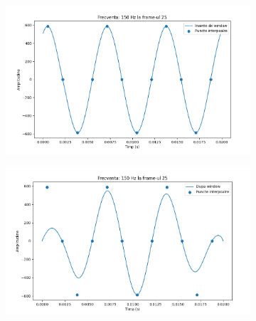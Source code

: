 \documentclass[12pt]{article}
\begin{document}
\begin{figure}[H]
	\centering
	\begin{subfigure}[b]{1\textwidth}
		\includegraphics[width=\linewidth]{grafic1.png}
	\end{subfigure}
	\hfill
	\begin{subfigure}[b]{1\textwidth}
		\includegraphics[width=\linewidth]{grafic2.png}
	\end{subfigure}
\end{figure}

\newpage
\end{document}
